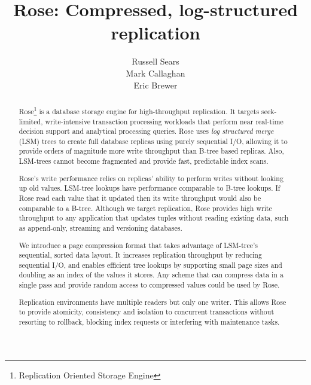 \documentclass{vldb}
\newcommand{\rows}{Rose\xspace}
\newcommand{\rowss}{Rose's\xspace}
\begin{document}
\title{{\ttlit \rows}: Compressed, log-structured replication}
%
%
\author{
\alignauthor
Russell Sears\\
\alignauthor
Mark Callaghan\\
\alignauthor
Eric Brewer\\
}
\maketitle
\begin{abstract}
\rows\footnote{Replication Oriented Storage
  Engine} is a database storage engine for high-throughput
replication. It targets seek-limited,
write-intensive transaction processing workloads that perform
near real-time decision support and analytical processing queries.
\rows uses {\em log structured merge} (LSM) trees to create full
database replicas using purely sequential I/O, allowing it to provide
orders of magnitude more write throughput than B-tree based replicas.
Also, LSM-trees cannot become fragmented and provide fast, predictable index scans.

\rowss write performance relies on replicas' ability to perform writes without
looking up old values.  LSM-tree lookups have
performance comparable to B-tree lookups.  If \rows read each value
that it updated then its write throughput would also be comparable
to a B-tree.
Although we target replication, \rows provides
high write throughput to any application that updates tuples
without reading existing data, such as append-only, streaming and
versioning databases.

We introduce a page compression
format that takes advantage of LSM-tree's sequential, sorted data
layout.  It increases replication throughput by reducing sequential
I/O, and enables efficient tree lookups by supporting small page sizes and doubling as an index of the
values it stores.  Any scheme that can
compress data in a single pass and provide random access to compressed
values could be used by \rows.

Replication environments have multiple readers but only one writer.
This allows \rows to provide atomicity, consistency and isolation to
concurrent transactions without resorting to rollback, blocking index
requests or interfering with maintenance tasks.


\end{abstract}
\end{document}
